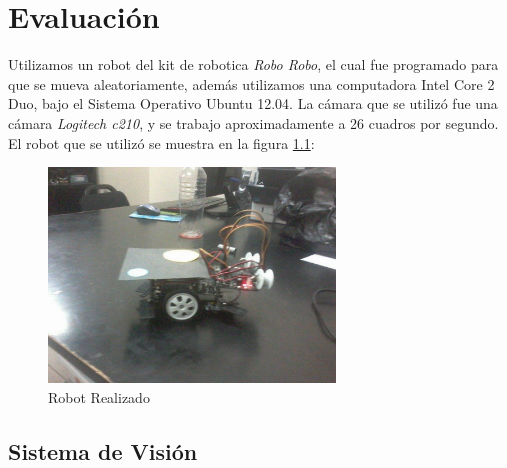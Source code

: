 
\chapter{Evaluaci\'on}
Utilizamos un robot del kit de robotica \textit{Robo Robo},  el cual fue programado para que se mueva aleatoriamente, adem\'as utilizamos una computadora Intel Core 2 Duo, bajo el Sistema Operativo Ubuntu 12.04. La c\'amara que se utiliz\'o fue una c\'amara \textit{Logitech c210}, y se trabajo aproximadamente a 26 cuadros por segundo. El robot que se utiliz\'o se muestra en la figura \ref{fig_rob}: \\
\begin{figure}
	\centering
	\includegraphics[width=3.0in]{robotsito.pdf}
	
	\caption{Robot Realizado}
	\label{fig_rob}
\end{figure}
\section{Sistema de Visi\'on}


